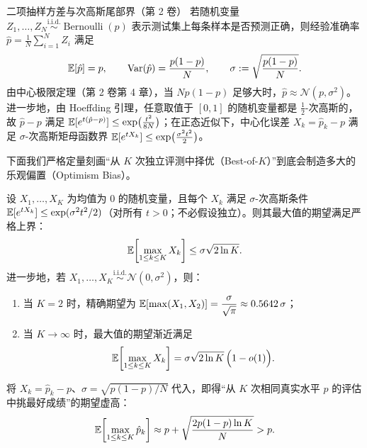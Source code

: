 \begin{recallBox}{二项抽样方差与次高斯尾部界（第 2 卷）}
若随机变量 $Z_1,\dots,Z_N \stackrel{\text{i.i.d.}}{\sim} \operatorname{Bernoulli}(p)$ 表示测试集上每条样本是否预测正确，则经验准确率 $\hat{p} = \frac{1}{N}\sum_{i=1}^N Z_i$ 满足
\[
  \mathbb{E}[\hat{p}] = p, \qquad \operatorname{Var}(\hat{p}) = \frac{p(1-p)}{N}, \qquad \sigma := \sqrt{\frac{p(1-p)}{N}}.
\]
由中心极限定理（第 2 卷第 4 章），当 $Np(1-p)$ 足够大时，$\hat{p} \approx \mathcal{N}(p, \sigma^2)$。进一步地，由 Hoeffding 引理，任意取值于 $[0,1]$ 的随机变量都是 $\frac{1}{2}$-次高斯的，故 $\hat{p} - p$ 满足 $\mathbb{E}[e^{t(\hat{p}-p)}] \le \exp\!\big(\frac{t^2}{8N}\big)$；在正态近似下，中心化误差 $X_k = \hat{p}_k - p$ 满足 $\sigma$-次高斯矩母函数界 $\mathbb{E}[e^{tX_k}] \le \exp\!\big(\frac{\sigma^2 t^2}{2}\big)$。
\end{recallBox}

下面我们严格定量刻画“从 $K$ 次独立评测中择优（Best-of-$K$）”到底会制造多大的乐观偏置（Optimism Bias）。

\begin{thmBox}
\begin{theorem}\label{thm:best-of-k}
设 $X_1,\dots,X_K$ 为均值为 $0$ 的随机变量，且每个 $X_k$ 满足 $\sigma$-次高斯条件 $\mathbb{E}[e^{t X_k}] \le \exp(\sigma^2 t^2 / 2)$（对所有 $t > 0$；不必假设独立）。则其最大值的期望满足严格上界：
\begin{equation}\label{eq:subgaussian-max}
  \mathbb{E}\!\left[\max_{1\le k\le K} X_k\right] \le \sigma\sqrt{2\ln K}.
\end{equation}
进一步地，若 $X_1,\dots,X_K \stackrel{\text{i.i.d.}}{\sim} \mathcal{N}(0, \sigma^2)$，则：
\begin{enumerate}
  \item 当 $K=2$ 时，精确期望为 $\mathbb{E}[\max(X_1, X_2)] = \dfrac{\sigma}{\sqrt{\pi}} \approx 0.5642\,\sigma$；
  \item 当 $K \to \infty$ 时，最大值的期望渐近满足
  \begin{equation}\label{eq:gaussian-max-asymp}
    \mathbb{E}\!\left[\max_{1\le k\le K} X_k\right] = \sigma\sqrt{2\ln K}\,\Big(1 - o(1)\Big).
  \end{equation}
\end{enumerate}
将 $X_k = \hat{p}_k - p$、$\sigma = \sqrt{p(1-p)/N}$ 代入，即得“从 $K$ 次相同真实水平 $p$ 的评估中挑最好成绩”的期望虚高：
\begin{equation}\label{eq:seed-inflation}
  \mathbb{E}\!\left[\max_{1\le k\le K} \hat{p}_k\right] \approx p + \sqrt{\frac{2p(1-p)\ln K}{N}} > p.
\end{equation}
\end{theorem}
\end{thmBox}

